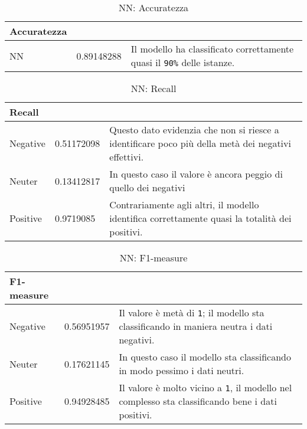 		\begin{table} [H]
			\caption{NN: Accuratezza}
			\label{tab:accNN}
			\centering
			\begin{tabular}{llp{}}
				\toprule 
				\textbf{Accuratezza}	\\
				\midrule
				NN  & 0.89148288 & Il modello ha classificato correttamente quasi il \verb|90%| delle istanze.\\
				\bottomrule
			\end{tabular}
		\end{table}
		
		\begin{table} [H]
			\caption{NN: Recall}
			\label{tab:RecallNN}
			\centering
			\begin{tabular}{llp{}}
				\toprule 
				\textbf{Recall}	\\
				\midrule
				Negative  & 0.51172098  & Questo dato evidenzia che non si riesce a identificare poco più della metà dei negativi effettivi.\\
				Neuter & 0.13412817 & In questo caso il valore è ancora peggio di quello dei negativi\\
				Positive & 0.9719085 & Contrariamente agli altri, il modello identifica correttamente quasi la totalità dei positivi.\\
				\bottomrule
			\end{tabular}
		\end{table}
		
		\begin{table} [H]
			\caption{NN: F1-measure}
			\label{tab:F1-measureNN}
			\centering
			\begin{tabular}{llp{}}
				\toprule 
				\textbf{F1-measure}	\\
				\midrule
				Negative  & 0.56951957  & Il valore è metà di \verb|1|; il modello sta classificando in maniera neutra i dati negativi.\\
				Neuter & 0.17621145 & In questo caso il modello sta classificando in modo pessimo i dati neutri.\\
				Positive & 0.94928485 & Il valore è molto vicino a \verb|1|, il modello nel complesso sta classificando bene i dati positivi.\\
				\bottomrule
			\end{tabular}
		\end{table}
		
		